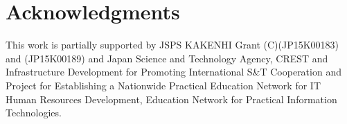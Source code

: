 \documentclass{llncs}
\begin{document}
\section*{Acknowledgments}
%
This work is partially supported by JSPS KAKENHI Grant (C)(JP15K00183)
and (JP15K00189) and Japan Science and Technology Agency, CREST and
Infrastructure Development for Promoting International S\&T
Cooperation and Project for Establishing a Nationwide Practical
Education Network for IT Human Resources Development, Education
Network for Practical Information Technologies.
%

%
%


\end{document}

